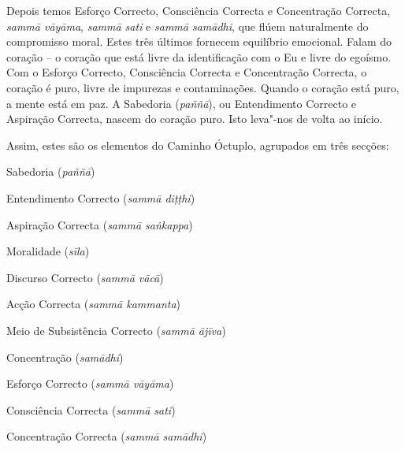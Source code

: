 Depois temos Esforço Correcto, Consciência Correcta e Concentração Correcta,
\emph{sammā vāyāma}, \emph{sammā sati} e \emph{sammā samādhi}, que flúem
naturalmente do compromisso moral. Estes três últimos fornecem equilíbrio
emocional. Falam do coração – o coração que está livre da identificação com o Eu
e livre do egoísmo. Com o Esforço Correcto, Consciência Correcta e Concentração
Correcta, o coração é puro, livre de impurezas e contaminações. Quando o coração
está puro, a mente está em paz. A Sabedoria (\emph{paññā}), ou Entendimento
Correcto e Aspiração Correcta, nascem do coração puro. Isto leva"-nos de volta ao
início.

\clearpage

Assim, estes são os elementos do Caminho Óctuplo, agrupados em três secções:

\bigskip

\noindent
Sabedoria (\emph{paññā})

\bigskip

\begin{packedenumerate}

\item Entendimento Correcto (\emph{sammā diṭṭhi})
\item Aspiração Correcta (\emph{sammā saṅkappa})

\end{packedenumerate}

\bigskip

\noindent
Moralidade (\emph{sīla})

\bigskip

\begin{packedenumerate}
\setcounter{enumi}{2}

\item Discurso Correcto (\emph{sammā vācā})
\item Acção Correcta (\emph{sammā kammanta})
\item Meio de Subsistência Correcto (\emph{sammā ājīva})

\end{packedenumerate}

\bigskip

\noindent
Concentração (\emph{samādhi})

\bigskip

\begin{packedenumerate}
\setcounter{enumi}{5}

\item Esforço Correcto (\emph{sammā vāyāma})
\item Consciência Correcta (\emph{sammā sati})
\item Concentração Correcta (\emph{sammā samādhi})

\end{packedenumerate}

